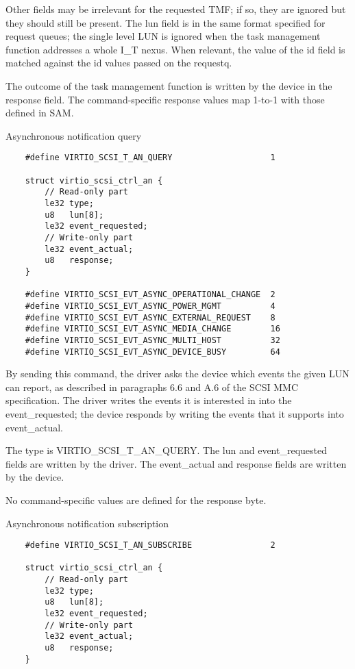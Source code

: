   Other fields may be irrelevant for the requested TMF; if so,
  they are ignored but they should still be present. The lun
  field is in the same format specified for request queues; the
  single level LUN is ignored when the task management function
  addresses a whole I_T nexus. When relevant, the value of the id
  field is matched against the id values passed on the requestq.

  The outcome of the task management function is written by the
  device in the response field. The command-specific response
  values map 1-to-1 with those defined in SAM.

  Asynchronous notification query

\begin{lstlisting}
	#define VIRTIO_SCSI_T_AN_QUERY                    1

	struct virtio_scsi_ctrl_an {
	    // Read-only part
	    le32 type;
	    u8   lun[8];
	    le32 event_requested;
	    // Write-only part
	    le32 event_actual;
	    u8   response;
	}

	#define VIRTIO_SCSI_EVT_ASYNC_OPERATIONAL_CHANGE  2
	#define VIRTIO_SCSI_EVT_ASYNC_POWER_MGMT          4
	#define VIRTIO_SCSI_EVT_ASYNC_EXTERNAL_REQUEST    8
	#define VIRTIO_SCSI_EVT_ASYNC_MEDIA_CHANGE        16
	#define VIRTIO_SCSI_EVT_ASYNC_MULTI_HOST          32
	#define VIRTIO_SCSI_EVT_ASYNC_DEVICE_BUSY         64
\end{lstlisting}

  By sending this command, the driver asks the device which
  events the given LUN can report, as described in paragraphs 6.6
  and A.6 of the SCSI MMC specification. The driver writes the
  events it is interested in into the event_requested; the device
  responds by writing the events that it supports into
  event_actual.

  The type is VIRTIO_SCSI_T_AN_QUERY. The lun and event_requested
  fields are written by the driver. The event_actual and response
  fields are written by the device.

  No command-specific values are defined for the response byte.

  Asynchronous notification subscription
\begin{lstlisting}
	#define VIRTIO_SCSI_T_AN_SUBSCRIBE                2

	struct virtio_scsi_ctrl_an {
		// Read-only part
		le32 type;
		u8   lun[8];
		le32 event_requested;
		// Write-only part
		le32 event_actual;
		u8   response;
	}
\end{lstlisting}

